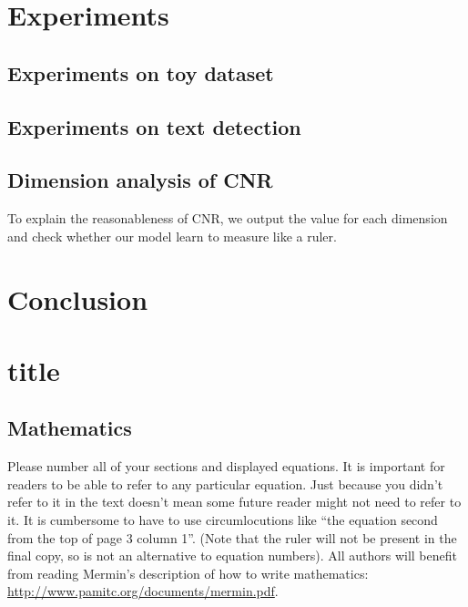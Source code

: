 \documentclass[10pt,twocolumn,letterpaper]{article}
\begin{document}
\section{Experiments}
\subsection{Experiments on toy dataset}

\subsection{Experiments on text detection}
\subsection{Dimension analysis of CNR} %
To explain the reasonableness of CNR, we output the value for each dimension and check whether our model learn to measure like a ruler.

\section{Conclusion}

\section{title}




\subsection{Mathematics}

Please number all of your sections and displayed equations.  It is
important for readers to be able to refer to any particular equation.  Just
because you didn't refer to it in the text doesn't mean some future reader
might not need to refer to it.  It is cumbersome to have to use
circumlocutions like ``the equation second from the top of page 3 column
1''.  (Note that the ruler will not be present in the final copy, so is not
an alternative to equation numbers).  All authors will benefit from reading
Mermin's description of how to write mathematics:
\url{http://www.pamitc.org/documents/mermin.pdf}.
\end{document}
